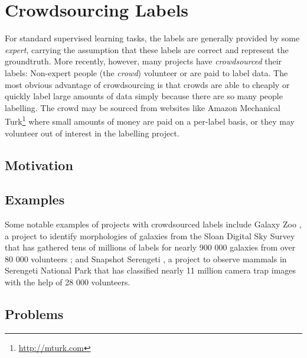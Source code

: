 \section{Crowdsourcing Labels}
\label{sec:crowdsourcing}

    For standard supervised learning tasks, the labels are generally
    provided by some \emph{expert}, carrying the assumption that these
    labels are correct and represent the groundtruth. More recently,
    however, many projects have \emph{crowdsourced} their labels: Non-expert
    people (the \emph{crowd}) volunteer or are paid to label data. The most
    obvious advantage of crowdsourcing is that crowds are able to cheaply or
    quickly label large amounts of data simply because there are so many
    people labelling. The crowd may be sourced from websites like Amazon
    Mechanical Turk\footnote{\url{http://mturk.com}} where small amounts of
    money are paid on a per-label basis, or they may volunteer out of
    interest in the labelling project.

    \subsection{Motivation}
    \label{sec:crowdsourcing-motivation}


    \subsection{Examples}
    \label{sec:crowdsourcing-examples}

        Some notable examples of projects with crowdsourced labels include
        Galaxy Zoo \citep{lintott08}, a project to identify morphologies of
        galaxies from the Sloan Digital Sky Survey that has gathered tens of
        millions of labels for nearly 900 000 galaxies from over 80 000
        volunteers \citep{lintott11}; and Snapshot Serengeti \citep{swanson15},
        a project to observe mammals in Serengeti National Park that has
        classified nearly 11 million camera trap images with the help of 28 000
        volunteers.


    \subsection{Problems}
    \label{sec:crowdsourcing-problems}

